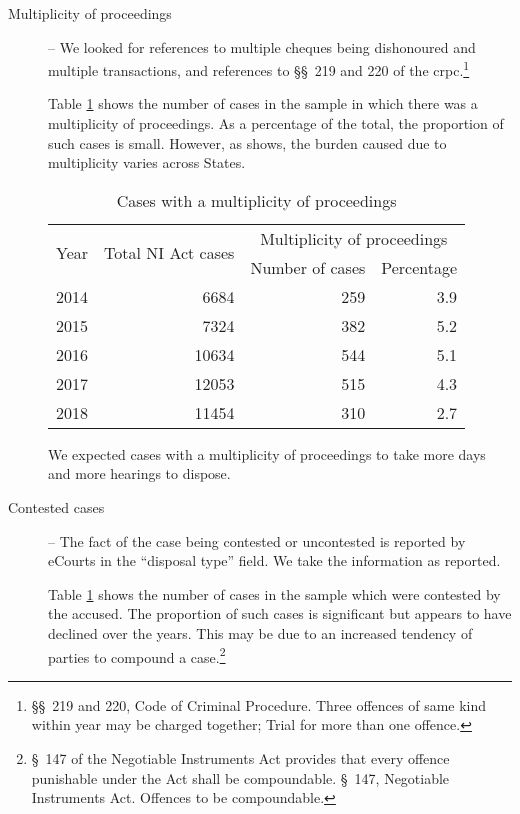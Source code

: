 \begin{description}
\item[]

\item [Multiplicity of proceedings] -- We looked for references to multiple cheques being dishonoured and multiple transactions, and references to \S\S~219 and 220 of the \gls{crpc}.\footnote{\S\S~219 and 220, Code of Criminal Procedure. Three offences of same kind within year may be charged together; Trial for more than one offence.}

Table \ref{tab:mult_yearWise} shows the number of cases in the sample in which there was a multiplicity of proceedings. As a percentage of the total, the proportion of such cases is small. However, as  shows, the burden caused due to multiplicity varies across States.

\begin{longtable}{@{}lrrr@{}}
 \caption{Cases with a multiplicity of proceedings}\label{tab:mult_yearWise}\\
\toprule
\multirow{2}{*}{Year} & \multirow{2}{*}{Total NI Act cases} & \multicolumn{2}{c}{Multiplicity of proceedings}\\
\cmidrule{3-4}
&& Number of cases & Percentage \\
\midrule\endhead
2014 & 6684 & 259 & 3.9 \\
2015 & 7324 & 382 & 5.2 \\
2016 & 10634 & 544 & 5.1 \\
2017 & 12053 & 515 & 4.3 \\
2018 & 11454 & 310 & 2.7 \\
\bottomrule
\end{longtable}

We expected cases with a multiplicity of proceedings to take more days and more hearings to dispose.

\item[]

\item [Contested cases] -- The fact of the case being contested or uncontested is reported by eCourts in the ``disposal type'' field. We take the information as reported.

  Table \ref{tab:mult_yearWise} shows the number of cases in the sample which were contested by the accused. The proportion of such cases is significant but appears to have declined over the years. This may be due to an increased tendency of parties to compound a case.\footnote{\S~147 of the Negotiable Instruments Act provides that every offence punishable under the Act shall be compoundable. \S~147, Negotiable Instruments Act. Offences to be compoundable.}


\end{description}
